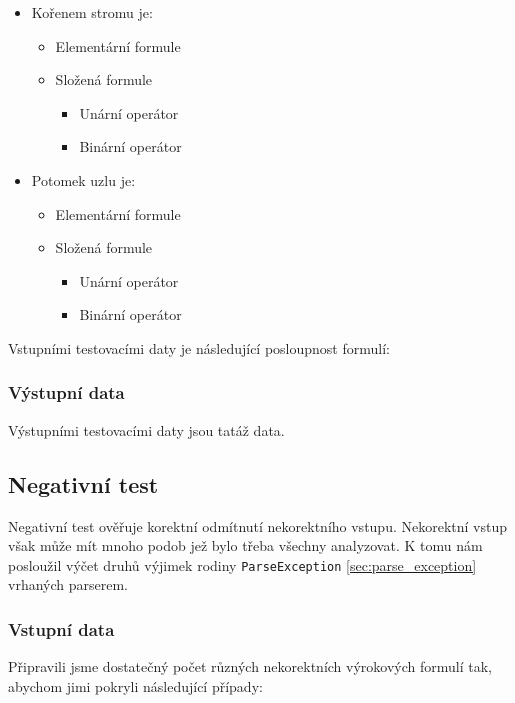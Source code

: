 \documentclass[thesis=B,czech,hidelinks]{thesis}[2012/06/26]
\begin{document}
\begin{itemize}
	\item Kořenem stromu je:
	\begin{itemize}
		\item Elementární formule
		\item Složená formule
		\begin{itemize}
			\item Unární operátor
			\item Binární operátor
		\end{itemize}
	\end{itemize}
	\item Potomek uzlu je:
	\begin{itemize}
		\item Elementární formule
		\item Složená formule
		\begin{itemize}
			\item Unární operátor
			\item Binární operátor
		\end{itemize}
	\end{itemize}
\end{itemize}

Vstupními testovacími daty je následující posloupnost formulí:



\subsubsection{Výstupní data}

Výstupními testovacími daty jsou tatáž data.

\subsection{Negativní test}

Negativní test ověřuje korektní odmítnutí nekorektního vstupu. Nekorektní vstup však může mít mnoho podob jež bylo třeba všechny analyzovat. K tomu nám posloužil výčet druhů výjimek rodiny \texttt{ParseException} \ref{sec:parse_exception} vrhaných parserem.

\subsubsection{Vstupní data}

Připravili jsme dostatečný počet různých nekorektních výrokových formulí tak, abychom jimi pokryli následující případy:
\end{document}
